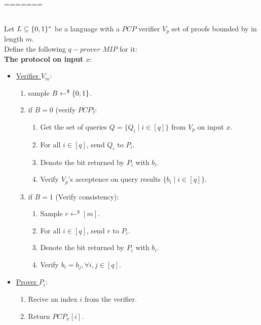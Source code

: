 =======

\subsection{}
Let $L\subseteq\{0,1\}^*$ be a language with a $PCP$ verifier $V_p$ set of proofs
bounded by in length $m$.\\
Define the following $q-prover$ $MIP$ for it:\\
\textbf{The protocol on input $x$}:
\begin{itemize}
	\item \underline{Verifier $V_m$}:
		\begin{enumerate}
			\item sample $B\leftarrow^\$\{0,1\}$.
			\item if $B=0$ (verify $PCP$):
			\begin{enumerate}
				\item Get the set of queries $Q=\{Q_i\mid i\in[q]\}$ from $V_p$ on input $x$.
				\item For all $i\in[q]$, send $Q_i$ to $P_i$.
				\item Denote the bit returned by $P_i$ with $b_i$.
				\item Verify $V_p$'s acceptence on query results $\{b_i\mid i\in[q]\}$.
			\end{enumerate}
			\item if $B=1$ (Verify consistency):
			\begin{enumerate}
				\item Sample $r\leftarrow^\$[m]$.
				\item For all $i\in[q]$, send $r$ to $P_i$.
				\item Denote the bit returned by $P_i$ with $b_i$.
				\item Verify $b_i=b_j, \forall i,j\in[q]$.
			\end{enumerate}
		\end{enumerate}
	\item \underline{Prover $P_i$}:
		\begin{enumerate}	
			\item Recive an index $i$ from the verifier.
			\item Return $PCP_x[i]$.
		\end{enumerate}	
\end{itemize}



